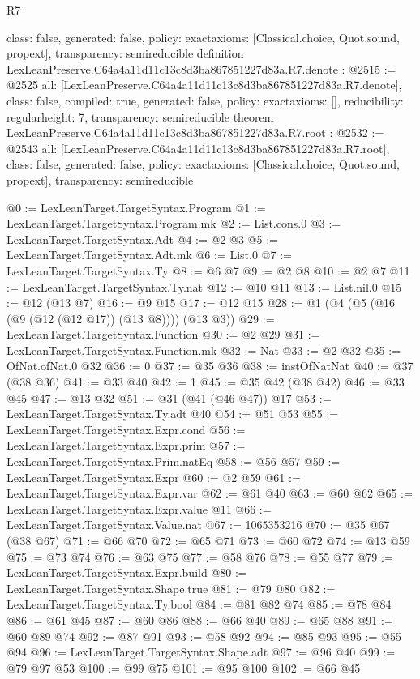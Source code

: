 \begin{lexlean}{R7}
\begin{coremodule}
{  class: false,
  generated: false,
  policy: exact{axioms: [Classical.choice, Quot.sound, propext]},
  transparency: semireducible
}
definition LexLeanPreserve.C64a4a11d11c13c8d3ba867851227d83a.R7.denote : @2515 := @2525 {
  all: [LexLeanPreserve.C64a4a11d11c13c8d3ba867851227d83a.R7.denote],
  class: false,
  compiled: true,
  generated: false,
  policy: exact{axioms: []},
  reducibility: regular{height: 7},
  transparency: semireducible
}
theorem LexLeanPreserve.C64a4a11d11c13c8d3ba867851227d83a.R7.root : @2532 := @2543 {
  all: [LexLeanPreserve.C64a4a11d11c13c8d3ba867851227d83a.R7.root],
  class: false,
  generated: false,
  policy: exact{axioms: [Classical.choice, Quot.sound, propext]},
  transparency: semireducible
}

@0 := LexLeanTarget.TargetSyntax.Program
@1 := LexLeanTarget.TargetSyntax.Program.mk
@2 := List.cons.{0}
@3 := LexLeanTarget.TargetSyntax.Adt
@4 := @2 @3
@5 := LexLeanTarget.TargetSyntax.Adt.mk
@6 := List.{0}
@7 := LexLeanTarget.TargetSyntax.Ty
@8 := @6 @7
@9 := @2 @8
@10 := @2 @7
@11 := LexLeanTarget.TargetSyntax.Ty.nat
@12 := @10 @11
@13 := List.nil.{0}
@15 := @12 (@13 @7)
@16 := @9 @15
@17 := @12 @15
@28 := @1 (@4 (@5 (@16 (@9 (@12 (@12 @17)) (@13 @8)))) (@13 @3))
@29 := LexLeanTarget.TargetSyntax.Function
@30 := @2 @29
@31 := LexLeanTarget.TargetSyntax.Function.mk
@32 := Nat
@33 := @2 @32
@35 := OfNat.ofNat.{0} @32
@36 := 0
@37 := @35 @36
@38 := instOfNatNat
@40 := @37 (@38 @36)
@41 := @33 @40
@42 := 1
@45 := @35 @42 (@38 @42)
@46 := @33 @45
@47 := @13 @32
@51 := @31 (@41 (@46 @47)) @17
@53 := LexLeanTarget.TargetSyntax.Ty.adt @40
@54 := @51 @53
@55 := LexLeanTarget.TargetSyntax.Expr.cond
@56 := LexLeanTarget.TargetSyntax.Expr.prim
@57 := LexLeanTarget.TargetSyntax.Prim.natEq
@58 := @56 @57
@59 := LexLeanTarget.TargetSyntax.Expr
@60 := @2 @59
@61 := LexLeanTarget.TargetSyntax.Expr.var
@62 := @61 @40
@63 := @60 @62
@65 := LexLeanTarget.TargetSyntax.Expr.value @11
@66 := LexLeanTarget.TargetSyntax.Value.nat
@67 := 1065353216
@70 := @35 @67 (@38 @67)
@71 := @66 @70
@72 := @65 @71
@73 := @60 @72
@74 := @13 @59
@75 := @73 @74
@76 := @63 @75
@77 := @58 @76
@78 := @55 @77
@79 := LexLeanTarget.TargetSyntax.Expr.build
@80 := LexLeanTarget.TargetSyntax.Shape.true
@81 := @79 @80
@82 := LexLeanTarget.TargetSyntax.Ty.bool
@84 := @81 @82 @74
@85 := @78 @84
@86 := @61 @45
@87 := @60 @86
@88 := @66 @40
@89 := @65 @88
@91 := @60 @89 @74
@92 := @87 @91
@93 := @58 @92
@94 := @85 @93
@95 := @55 @94
@96 := LexLeanTarget.TargetSyntax.Shape.adt
@97 := @96 @40
@99 := @79 @97 @53
@100 := @99 @75
@101 := @95 @100
@102 := @66 @45

\end{coremodule}
\end{lexlean}
